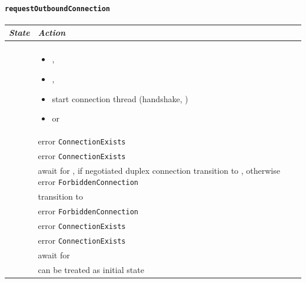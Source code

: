 \paragraph{\texttt{requestOutboundConnection}}\label{sub:includeOutboundConnect}
\begin{center}
  \begin{tabular}[h]{ll}
    \textit{State}           & \textit{Action} \\\hline\\[2pt]
    \InitialState{}          &
      \begin{minipage}[t]{8cm}
        \begin{itemize}
          \item \ReservedOutboundState{},
          \item \Connected{},
          \item start connection thread (handshake, \mux{})
          \item \NegotiatedUniOut{} or \NegotiatedDupOut{}
        \end{itemize}
      \end{minipage}
      \vspace{8pt}\\
    \ReservedOutboundState{} & error \texttt{ConnectionExists} \\[8pt]
    \UnnegotiatedStateOut{}  & error \texttt{ConnectionExists} \\[8pt]
    \UnnegotiatedStateIn{  } &
      \begin{minipage}[t]{7cm}
        await for \InboundStateAny{}, if negotiated duplex connection
        transition to \DuplexState{}, otherwise error
        \texttt{ForbiddenConnection}
      \end{minipage}
      \vspace{8pt}\\
    \InboundIdleStateDup{}   & transition to \OutboundStateDup{}  \\[8pt]
    \InboundIdleStateUni{}   & error \texttt{ForbiddenConnection} \\[8pt]
    \OutboundStateAny{}      & error \texttt{ConnectionExists} \\[8pt]
    \DuplexState{}           & error \texttt{ConnectionExists} \\[8pt]
    \TerminatingState{}      & await for \TerminatedState{}    \\[8pt]
    \TerminatedState{}       & can be treated as initial state \\[8pt]
  \end{tabular}
\end{center}

